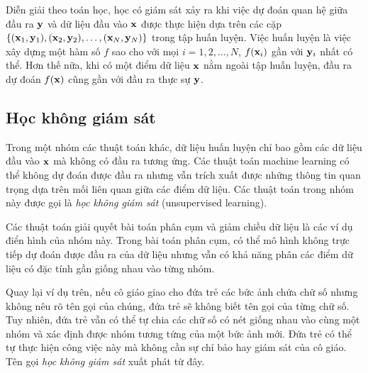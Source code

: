 Diễn giải theo toán học, học có giám sát xảy ra khi việc dự đoán quan hệ giữa
đầu ra $\mathbf{y}$ và dữ liệu đầu vào $\mathbf{x}$ được thực hiện dựa trên các cặp $\{(\mathbf{x}_1,
\mathbf{y}_1), (\mathbf{x}_2, \mathbf{y}_2), \dots, (\mathbf{x}_N, \mathbf{y}_N)\}$ trong tập huấn luyện. Việc huấn
luyện là việc xây dựng một hàm số $f$ sao cho với mọi $i = 1, 2, \dots, N$,
$f(\mathbf{x}_i)$ gần với $\mathbf{y}_i$ nhất có thể. Hơn thế nữa, khi có một điểm dữ liệu
$\mathbf{x}$ nằm ngoài tập huấn luyện, đầu ra dự đoán $f(\mathbf{x})$ cũng gần với đầu ra
thực sự $\mathbf{y}$.



\subsection{Học không giám sát}
Trong một nhóm các thuật toán khác, dữ liệu huấn luyện chỉ bao gồm các dữ liệu đầu vào $\mathbf{x}$ mà không có đầu ra tương ứng. Các thuật toán machine learning có thể không dự đoán được đầu ra nhưng vẫn trích xuất được những thông tin quan trọng dựa trên mối liên quan giữa các điểm dữ liệu. Các thuật toán trong nhóm này được gọi là \textit{học không giám sát} (unsupervised learning).

Các thuật toán giải quyết bài toán phân cụm và giảm chiều dữ liệu là các ví dụ
điển hình của nhóm này. Trong bài toán phân cụm, có thể mô hình không trực tiếp
dự đoán được đầu ra của dữ liệu nhưng vẫn có khả năng phân các điểm dữ liệu có
đặc tính gần giống nhau vào từng nhóm.

Quay lại ví dụ trên, nếu cô giáo giao cho đứa trẻ các bức ảnh chứa chữ số nhưng không nêu rõ tên gọi của chúng, đứa trẻ sẽ không biết tên gọi của từng chữ số. Tuy nhiên, đứa trẻ vẫn có thể tự chia các chữ số có nét giống nhau vào cùng một nhóm và xác định được nhóm tương tứng của một bức ảnh mới. Đứa trẻ có thể tự thực hiện công việc này mà không cần sự chỉ bảo hay giám sát của cô giáo. Tên gọi \textit{học không giám sát} xuất phát từ đây.


